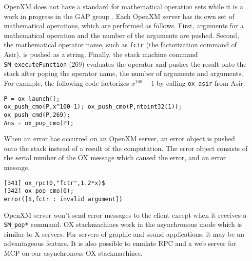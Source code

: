 OpenXM does not have a standard for mathematical operation sets
while it is a work in progress in the GAP group \cite{gap}.
Each OpenXM server has its own set of mathematical operations,
which are performed as follows.
First, arguments for a mathematical operation
and the number of the arguments are pushed.
Second, 
the mathematical operator name, 
such as {\tt fctr} (the factorization command of Asir),
is pushed as a string.
Finally, the stack machine command
{\tt SM\_executeFunction} (269) evaluates the operator and
pushes the result onto the stack
after poping the operator name, the number of arguments
and arguments.
For example, the following code factorizes $x^{100}-1$ by calling
{\tt ox\_asir} from Asir.
\begin{verbatim}
P = ox_launch(); 
ox_push_cmo(P,x^100-1); ox_push_cmo(P,ntoint32(1));
ox_push_cmd(P,269); 
Ans = ox_pop_cmo(P);
\end{verbatim}

When an error has occurred on an OpenXM server,
an error object is pushed onto the stack 
instead of a result of the computation.
The error object consists of the serial number of the OX message
which caused the error, and an error message.
\begin{verbatim}
[341] ox_rpc(0,"fctr",1.2*x)$
[342] ox_pop_cmo(0);
error([8,fctr : invalid argument])
\end{verbatim}

OpenXM server won't send error messages to the client
except when it receives a {\tt SM\_pop*} command.
OX stackmachines work in the asynchronous mode which is similar 
to X servers.
For servers of graphic and sound applications, 
it may be an advantageous feature.
It is also possible to emulate RPC and a web server for MCP \cite{iamc} 
on our asynchronous OX stackmachines.





